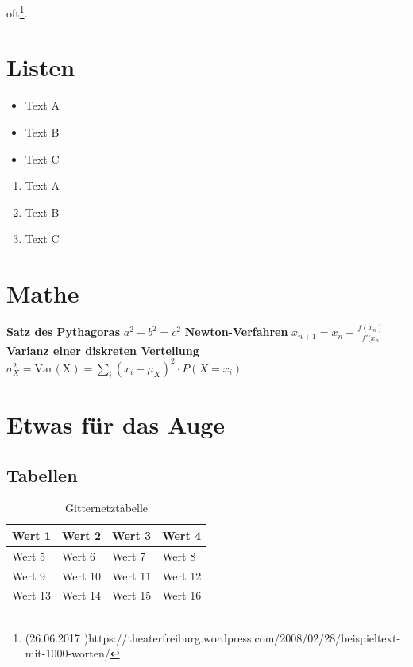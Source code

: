 \documentclass{scrreprt}
\begin{document}
oft\footnote{(26.06.2017 )https://theaterfreiburg.wordpress.com/2008/02/28/beispieltext-mit-1000-worten/}. 
	
	\chapter{Listen}
	
\begin{itemize}
	\item Text A
	\item Text B
	\item Text C
\end{itemize}


\begin{enumerate}
	\item Text A
	\item Text B
	\item Text C
\end{enumerate}

\chapter{Mathe}

\textbf{Satz des Pythagoras} 
\vspace{2pt}
\newline
$ a^{2} + b^{2} = c^{2} $
\vspace{10pt}
\newline
\textbf{Newton-Verfahren} 
\vspace{2pt}
\newline
$ x_{n+1} = x_{n} - \frac{f(x_{n})}{f'(x_{n}} $
\vspace{10pt}
\newline
\textbf{Varianz einer diskreten Verteilung} 
\vspace{2pt}
\newline
$ \sigma^2_{X} = \mathrm{Var(X)} = \sum_i (x_i - \mu_{X})^2 \cdot P(X = x_i) $

\chapter{Etwas für das Auge}
\section{Tabellen}

\begin{table}[htbp]
	\caption{Gitternetztabelle}
	\label { Tabelle 1.0}
	\centering
	\begin{tabular}{|l|l|l|l|}
		\hline
		Wert 1 & Wert 2 & Wert 3 & Wert 4 \\ \hline
		Wert 5 & Wert 6 & Wert 7 & Wert 8 \\ \hline
		Wert 9 & Wert 10 & Wert 11 & Wert 12  \\ \hline
		Wert 13 & Wert 14 & Wert 15 & Wert 16  \\ \hline
	\end{tabular}
	
\end{table}
\end{document}
